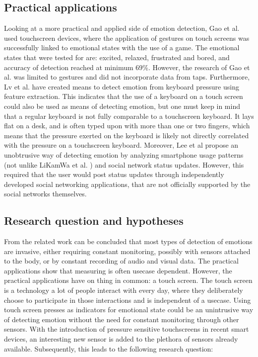 \documentclass{sigchi}
\begin{document}
\subsection{Practical applications} %
\label{sub:practical_applications}
Looking at a more practical and applied side of emotion detection, Gao et al. \cite{Gao2012} used touchscreen devices, where the application of gestures on touch screens was successfully linked to emotional states with the use of a game. The emotional states that were tested for are: excited, relaxed, frustrated and bored, and accuracy of detection reached at minimum 69\%. However, the research of Gao et al. was limited to gestures and did not incorporate data from taps. Furthermore, Lv et al. \cite{H.R.LvZ.L.LinW.J.Yin2008} have created means to detect emotion from keyboard pressure using feature extraction. This indicates that the use of a keyboard on a touch screen could also be used as means of detecting emotion, but one must keep in mind that a regular keyboard is not fully comparable to a touchscreen keyboard. It lays flat on a desk, and is often typed upon with more than one or two fingers, which means that the pressure exerted on the keyboard is likely not directly correlated with the pressure on a touchscreen keyboard. Moreover, Lee et al \cite{Lee2012} propose an unobtrusive way of detecting emotion by analyzing smartphone usage patterns (not unlike LiKamWa et al. \cite{Likamwa2013}) and social network status updates. However, this required that the user would post status updates through independently developed social networking applications, that are not officially supported by the social networks themselves.


\subsection{Research question and hypotheses}
From the related work can be concluded that most types of detection of emotions are invasive, either requiring constant monitoring, possibly with sensors attached to the body, or by constant recording of audio and visual data. The practical applications show that measuring is often usecase dependent. However, the practical applications have on thing in common: a touch screen. The touch screen is a technology a lot of people interact with every day, where they deliberately choose to participate in those interactions and is independent of a usecase. Using touch screen presses as indicators for emotional state could be an unintrusive way of detecting emotion without the need for constant monitoring through other sensors. With the introduction of pressure sensitive touchscreens in recent smart devices, an interesting new sensor is added to the plethora of sensors already available. Subsequently, this leads to the following research question:\\
\end{document}
